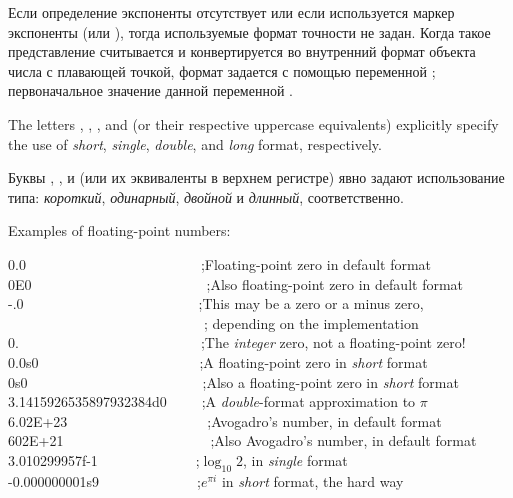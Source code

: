 Если определение экспоненты отсутствует или если используется маркер
экспоненты  (или ), тогда используемые формат точности не
задан. Когда такое представление считывается и конвертируется во внутренний
формат объекта числа с плавающей точкой, формат задается с помощью
переменной ; первоначальное значение данной
переменной .

The letters , , , and  (or their
respective uppercase equivalents) explicitly specify the
use of {\it short}, {\it single}, {\it double}, and {\it long} format, respectively.

Буквы  , ,  и  (или их эквиваленты в верхнем регистре)
явно задают использование типа: {\it короткий}, {\it одинарный}, {\it двойной} и
{\it длинный}, соответственно.

Examples of floating-point numbers:
\begin{lisp}
0.0~~~~~~~~~~~~~~~~~~~~~~~~~;{\rm Floating-point zero in default format} \\
0E0~~~~~~~~~~~~~~~~~~~~~~~~~;{\rm Also floating-point zero in default format} \\
-.0~~~~~~~~~~~~~~~~~~~~~~~~~;{\rm This may be a zero or a minus zero,} \\
~~~~~~~~~~~~~~~~~~~~~~~~~~~~; {\rm depending on the implementation} \\
0.~~~~~~~~~~~~~~~~~~~~~~~~~~;{\rm The {\it integer} zero, not a floating-point zero!} \\
0.0s0~~~~~~~~~~~~~~~~~~~~~~~;{\rm A floating-point zero in {\it short} format} \\
0s0~~~~~~~~~~~~~~~~~~~~~~~~~;{\rm Also a floating-point zero in {\it short} format} \\
3.1415926535897932384d0~~~~~;{\rm A {\it double}-format approximation to \(\pi\)} \\
6.02E+23~~~~~~~~~~~~~~~~~~~~;{\rm Avogadro's number, in default format} \\
602E+21~~~~~~~~~~~~~~~~~~~~~;{\rm Also Avogadro's number, in default format} \\
3.010299957f-1~~~~~~~~~~~~~~;{\rm \(\log_{10} 2\), in {\it single} format} \\
-0.000000001s9~~~~~~~~~~~~~~;{\rm \(e^{\pi i}\) in {\it short} format, the hard way}
\end{lisp}

